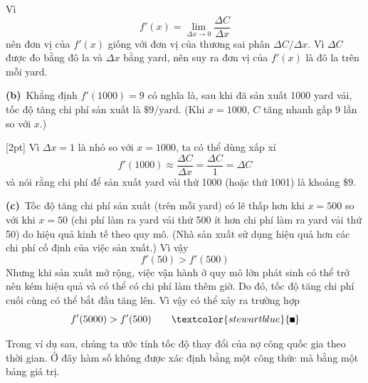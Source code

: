 Vì
\[
  f'(x) = \lim_{\Delta x \to 0} \frac{\Delta C}{\Delta x}
\]
nên đơn vị của $f'(x)$ giống với đơn vị của thương sai phân $\Delta C/\Delta x$. Vì $\Delta C$ được đo bằng đô la và $\Delta x$ bằng yard, nên suy ra đơn vị của $f'(x)$ là đô la trên mỗi yard.

\smallskip
\noindent\textbf{(b)}~Khẳng định $f'(1000) = 9$ có nghĩa là, sau khi đã sản xuất 1000 yard vải, tốc độ tăng chi phí sản xuất là $\$9/\text{yard}$. (Khi $x = 1000$, $C$ tăng nhanh gấp 9 lần so với $x$.)

[2pt]%
Vì $\Delta x = 1$ là nhỏ so với $x = 1000$, ta có thể dùng xấp xỉ
\[
  f'(1000) \approx \frac{\Delta C}{\Delta x} = \frac{\Delta C}{1} = \Delta C
\]
và nói rằng chi phí để sản xuất yard vải thứ 1000 (hoặc thứ 1001) là khoảng $\$9$.

\smallskip
\noindent\textbf{(c)}~Tốc độ tăng chi phí sản xuất (trên mỗi yard) có lẽ thấp hơn khi $x = 500$ so với khi $x = 50$ (chi phí làm ra yard vải thứ 500 ít hơn chi phí làm ra yard vải thứ 50) do hiệu quả kinh tế theo quy mô. (Nhà sản xuất sử dụng hiệu quả hơn các chi phí cố định của việc sản xuất.) Vì vậy
\[
  f'(50) > f'(500)
\]
Nhưng khi sản xuất mở rộng, việc vận hành ở quy mô lớn phát sinh có thể trở nên kém hiệu quả và có thể có chi phí làm thêm giờ. Do đó, tốc độ tăng chi phí cuối cùng có thể bắt đầu tăng lên. Vì vậy có thể xảy ra trường hợp
\begin{equation*}
  f'(5000) > f'(500) \tag*{$\textcolor{stewartblue}{\rule{1.1ex}{1.1ex}}$}
\end{equation*}

\vspace{0.6em}
\noindent Trong ví dụ sau, chúng ta ước tính tốc độ thay đổi của nợ công quốc gia theo thời gian. Ở đây hàm số không được xác định bằng một công thức mà bằng một bảng giá trị.
